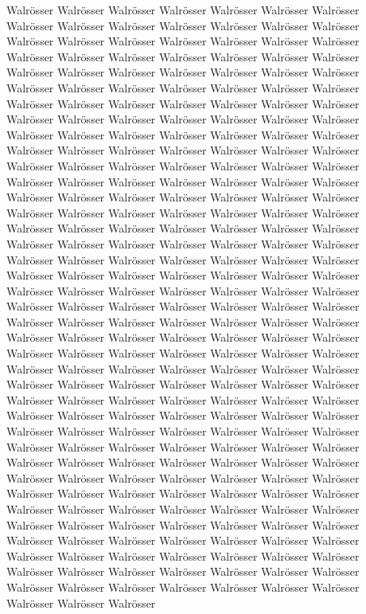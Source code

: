 \documentclass[a4paper, twoside, 12pt]{report}
\begin{document}
Walr\"osser Walr\"osser Walr\"osser Walr\"osser Walr\"osser Walr\"osser Walr\"osser Walr\"osser Walr\"osser Walr\"osser Walr\"osser Walr\"osser Walr\"osser Walr\"osser Walr\"osser Walr\"osser Walr\"osser Walr\"osser Walr\"osser Walr\"osser Walr\"osser Walr\"osser Walr\"osser Walr\"osser Walr\"osser Walr\"osser Walr\"osser Walr\"osser Walr\"osser Walr\"osser Walr\"osser Walr\"osser Walr\"osser Walr\"osser Walr\"osser Walr\"osser Walr\"osser Walr\"osser Walr\"osser Walr\"osser Walr\"osser Walr\"osser Walr\"osser Walr\"osser Walr\"osser Walr\"osser Walr\"osser Walr\"osser Walr\"osser  Walr\"osser Walr\"osser Walr\"osser Walr\"osser Walr\"osser Walr\"osser Walr\"osser Walr\"osser Walr\"osser Walr\"osser Walr\"osser Walr\"osser Walr\"osser Walr\"osser Walr\"osser Walr\"osser Walr\"osser Walr\"osser Walr\"osser Walr\"osser Walr\"osser Walr\"osser Walr\"osser Walr\"osser Walr\"osser Walr\"osser Walr\"osser Walr\"osser Walr\"osser Walr\"osser Walr\"osser Walr\"osser Walr\"osser Walr\"osser Walr\"osser Walr\"osser Walr\"osser Walr\"osser Walr\"osser Walr\"osser Walr\"osser Walr\"osser Walr\"osser Walr\"osser Walr\"osser Walr\"osser Walr\"osser Walr\"osser Walr\"osser Walr\"osser Walr\"osser Walr\"osser Walr\"osser Walr\"osser Walr\"osser Walr\"osser Walr\"osser Walr\"osser Walr\"osser Walr\"osser Walr\"osser Walr\"osser Walr\"osser Walr\"osser Walr\"osser Walr\"osser Walr\"osser Walr\"osser Walr\"osser Walr\"osser Walr\"osser Walr\"osser Walr\"osser Walr\"osser Walr\"osser Walr\"osser Walr\"osser Walr\"osser Walr\"osser Walr\"osser Walr\"osser Walr\"osser Walr\"osser Walr\"osser Walr\"osser Walr\"osser Walr\"osser Walr\"osser Walr\"osser Walr\"osser Walr\"osser Walr\"osser Walr\"osser Walr\"osser Walr\"osser Walr\"osser Walr\"osser Walr\"osser Walr\"osser Walr\"osser  Walr\"osser Walr\"osser Walr\"osser Walr\"osser Walr\"osser Walr\"osser Walr\"osser Walr\"osser Walr\"osser Walr\"osser Walr\"osser Walr\"osser Walr\"osser Walr\"osser Walr\"osser Walr\"osser Walr\"osser Walr\"osser Walr\"osser Walr\"osser Walr\"osser Walr\"osser Walr\"osser Walr\"osser Walr\"osser Walr\"osser Walr\"osser Walr\"osser Walr\"osser Walr\"osser Walr\"osser Walr\"osser Walr\"osser Walr\"osser Walr\"osser Walr\"osser Walr\"osser Walr\"osser Walr\"osser Walr\"osser Walr\"osser Walr\"osser Walr\"osser Walr\"osser Walr\"osser Walr\"osser Walr\"osser Walr\"osser Walr\"osser Walr\"osser Walr\"osser Walr\"osser Walr\"osser Walr\"osser Walr\"osser Walr\"osser Walr\"osser Walr\"osser Walr\"osser Walr\"osser Walr\"osser Walr\"osser Walr\"osser Walr\"osser Walr\"osser Walr\"osser Walr\"osser Walr\"osser Walr\"osser Walr\"osser Walr\"osser Walr\"osser Walr\"osser Walr\"osser Walr\"osser Walr\"osser Walr\"osser Walr\"osser Walr\"osser Walr\"osser Walr\"osser Walr\"osser Walr\"osser Walr\"osser Walr\"osser Walr\"osser Walr\"osser Walr\"osser Walr\"osser Walr\"osser Walr\"osser Walr\"osser Walr\"osser Walr\"osser Walr\"osser Walr\"osser Walr\"osser Walr\"osser Walr\"osser Walr\"osser  Walr\"osser Walr\"osser Walr\"osser Walr\"osser Walr\"osser Walr\"osser Walr\"osser Walr\"osser Walr\"osser Walr\"osser Walr\"osser Walr\"osser Walr\"osser Walr\"osser Walr\"osser Walr\"osser Walr\"osser Walr\"osser Walr\"osser Walr\"osser 
\end{document}
